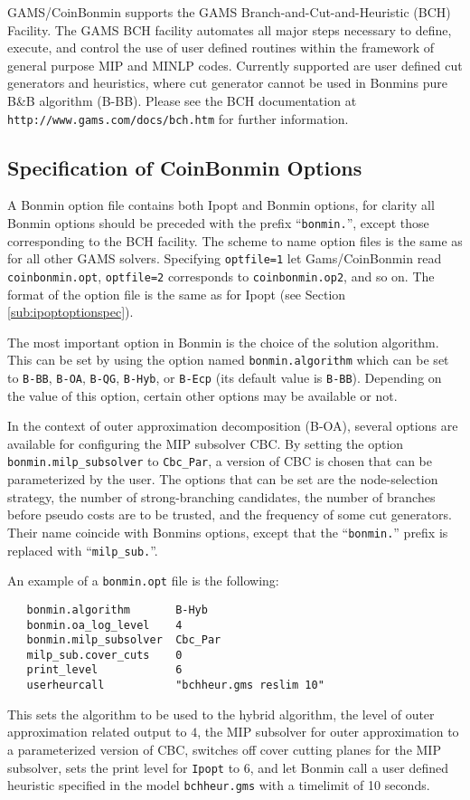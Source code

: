 GAMS/CoinBonmin supports the GAMS Branch-and-Cut-and-Heuristic (BCH) Facility.
The GAMS BCH facility automates all major steps necessary to define, execute, and control the use of user defined routines within the framework of general purpose MIP and MINLP codes.
Currently supported are user defined cut generators and heuristics, where cut generator cannot be used in Bonmins pure B\&B algorithm (B-BB).
Please see the BCH documentation at \texttt{http://www.gams.com/docs/bch.htm} for further information.

\subsection{Specification of CoinBonmin Options}
\label{sub:bonminoptionspec}

A Bonmin option file contains both Ipopt and Bonmin options, for clarity all Bonmin options should be preceded with the prefix ``\texttt{bonmin.}'', except those corresponding to the BCH facility.
The scheme to name option files is the same as for all other GAMS solvers.
Specifying \texttt{optfile=1} let Gams/CoinBonmin read \texttt{coinbonmin.opt}, \texttt{optfile=2} corresponds to \texttt{coinbonmin.op2}, and so on.
The format of the option file is the same as for Ipopt (see Section \ref{sub:ipoptoptionspec}).

The most important option in Bonmin is the choice of the solution algorithm.
This can be set by using the option named \texttt{bonmin.algorithm} which can be set to \texttt{B-BB}, \texttt{B-OA}, \texttt{B-QG}, \texttt{B-Hyb}, or \texttt{B-Ecp} (its default value is \texttt{B-BB}).
Depending on the value of this option, certain other options may be available or not.

In the context of outer approximation decomposition (B-OA), several options are available for configuring the MIP subsolver CBC.
By setting the option \texttt{bonmin.milp\_subsolver} to \texttt{Cbc\_Par}, a version of CBC is chosen that can be parameterized by the user.
The options that can be set are the node-selection strategy, the number of strong-branching candidates, the number of branches before pseudo costs are to be trusted, and the frequency of some cut generators.
Their name coincide with Bonmins options, except that the ``\texttt{bonmin.}'' prefix is replaced with  ``\texttt{milp\_sub.}''.

An example of a \texttt{bonmin.opt} file is the following:
\begin{verbatim}
   bonmin.algorithm       B-Hyb
   bonmin.oa_log_level    4
   bonmin.milp_subsolver  Cbc_Par
   milp_sub.cover_cuts    0
   print_level            6
   userheurcall           "bchheur.gms reslim 10"
\end{verbatim}
This sets the algorithm to be used to the hybrid algorithm, the level of outer approximation related output to $4$, the MIP subsolver for outer approximation to a parameterized version of CBC, switches off cover cutting planes for the MIP subsolver, sets the print level for \texttt{Ipopt} to $6$, and let Bonmin call a user defined heuristic specified in the model \texttt{bchheur.gms} with a timelimit of 10 seconds.

